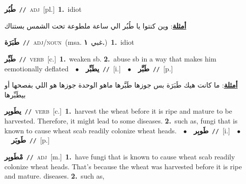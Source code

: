 \documentclass[10pt,a4paper,twoside]{article} %
\begin{document}
\begin{multicols}{2}
{{{{{{{{\setlength\topsep{0pt}\textbf{\foreignlanguage{arabic}{طُبُر}}\ {\color{gray}\texttt{//}\color{black}}\ \textsc{adj}\ [pl.]\ \textbf{1.}~idiot\  \begin{flushright}\color{gray}\foreignlanguage{arabic}{\textbf{\underline{\foreignlanguage{arabic}{أمثلة}}}: وين كنتوا يا طُبُر الي ساعة ملطوعة تحت الشمس بستناك}\end{flushright}\color{black}} \vspace{2mm}

{\setlength\topsep{0pt}\textbf{\foreignlanguage{arabic}{طَبَرَة}}\ {\color{gray}\texttt{//}\color{black}}\ \textsc{adj/noun}\ \color{gray}(msa. \foreignlanguage{arabic}{غبي}~\foreignlanguage{arabic}{\textbf{١.}})\color{black}\ \textbf{1.}~idiot\ 

{\setlength\topsep{0pt}\textbf{\foreignlanguage{arabic}{طَبِّر}}\ {\color{gray}\texttt{//}\color{black}}\ \textsc{verb}\ [c.]\ \textbf{1.}~weaken sb.  \textbf{2.}~abuse sb in a way that makes him eemotionally deflated\ \ $\bullet$\ \ \setlength\topsep{0pt}\textbf{\foreignlanguage{arabic}{يطَبِّر}}\ {\color{gray}\texttt{//}\color{black}}\ [i.]\ \ $\bullet$\ \ \setlength\topsep{0pt}\textbf{\foreignlanguage{arabic}{طَبَّر}}\ {\color{gray}\texttt{//}\color{black}}\ [p.]\  \begin{flushright}\color{gray}\foreignlanguage{arabic}{\textbf{\underline{\foreignlanguage{arabic}{أمثلة}}}: ما كانت هيك طَبَرَة بس جوزها طَبَّرها ماهو الوحدة جوزها هو اللي بفصحها أو بيطَبِّرها}\end{flushright}\color{black}} \vspace{2mm}

{\setlength\topsep{0pt}\textbf{\foreignlanguage{arabic}{يطَوبِر}}\ {\color{gray}\texttt{//}\color{black}}\ \textsc{verb}\ [c.]\ \textbf{1.}~harvest the wheat before it is ripe and mature to be harvested. Therefore, it might lead to some diseases.  \textbf{2.}~such as, fungi that is known to cause wheat scab readily colonize wheat heads.\ \ $\bullet$\ \ \setlength\topsep{0pt}\textbf{\foreignlanguage{arabic}{طَوبِر}}\ {\color{gray}\texttt{//}\color{black}}\ [i.]\ \ $\bullet$\ \ \setlength\topsep{0pt}\textbf{\foreignlanguage{arabic}{طَوبَر}}\ {\color{gray}\texttt{//}\color{black}}\ [p.]\ 

{\setlength\topsep{0pt}\textbf{\foreignlanguage{arabic}{مْطَوبِر}}\ {\color{gray}\texttt{//}\color{black}}\ \textsc{adj}\ [m.]\ \textbf{1.}~have fungi that is known to cause wheat scab readily colonize wheat heads. That's because the wheat was harvested before it is ripe and mature. diseases.  \textbf{2.}~such as,\ 

}}}}}}}}}}
\end{multicols}
\end{document}
